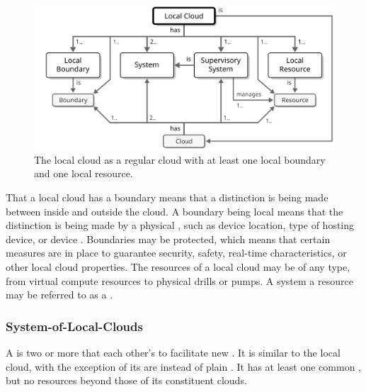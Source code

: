 \begin{figure}[ht!]
  \centering
  \includegraphics[scale=0.9]{figures/local-cloud}
  \caption{
    The local cloud as a regular cloud with at least one local boundary and one local resource.
  }
  \label{fig:local-cloud}
\end{figure}

That a local cloud has a boundary means that a distinction is being made between  inside and outside the cloud.
A boundary being local means that the distinction is being made by a physical , such as device location, type of hosting device, or device .
Boundaries may be protected, which means that certain measures are in place to guarantee security, safety, real-time characteristics, or other local cloud properties.
The resources of a local cloud may be of any type, from virtual compute resources to physical drills or pumps.
A system  a resource may be referred to as a .

\subsubsection{System-of-Local-Clouds}
\label{sec:reference-model:system-of-systems:system-of-local-clouds}

A  is two or more  that  each other's  to facilitate new .
It is similar to the local cloud, with the exception of its  are  instead of plain .
It has at least one common , but no resources beyond those of its constituent clouds.

